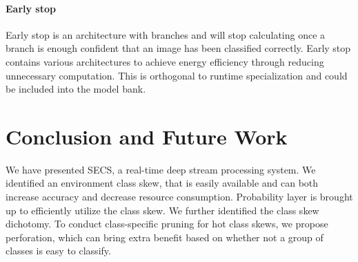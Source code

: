 \documentclass[pageno]{jpaper}
\begin{document}
\paragraph{Early stop}
Early stop \cite{teerapittayanon2016branchynet, panda2016conditional} is an architecture with branches and will stop calculating once a branch is enough confident that an image has been classified correctly. Early stop contains various architectures to achieve energy efficiency through reducing unnecessary computation. This is orthogonal to runtime specialization and could be included into the model bank.

\section{Conclusion and Future Work} \label{conclusion}
We have presented SECS, a real-time deep stream processing system. We identified an environment class skew, that is easily available and can both increase accuracy and decrease resource consumption. Probability layer is brought up to efficiently utilize the class skew. We further identified the class skew dichotomy. To conduct class-specific pruning for hot class skews, we propose perforation, which can bring extra benefit based on whether not a group of classes is easy to classify.







\end{document}
